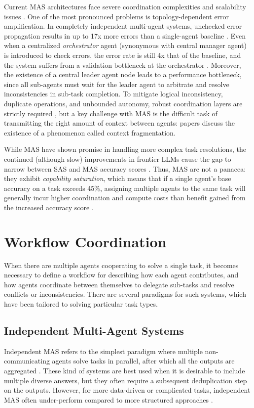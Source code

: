 \documentclass[conference]{IEEEtran}
\begin{document}
Current MAS architectures face severe coordination complexities and scalability issues 
\cite{yarmohammadtoosky_llm-powered_2026}. 
One of the most pronounced problems is topology-dependent error amplification. 
In completely independent multi-agent systems, unchecked error propagation results in up to 17x 
more errors than a single-agent baseline \cite{kim_towards_2026}. 
Even when a centralized \emph{orchestrator} agent (synonymous with central manager agent) 
is introduced to check errors, the error rate is still 4x that of the baseline, 
and the system suffers from a validation bottleneck at the orchestrator \cite{kim_towards_2026}.
Moreover, the existence of a central leader agent node leads to a performance bottleneck, since
all sub-agents must wait for the leader agent to arbitrate and resolve inconsistencies in sub-task
completion.
To mitigate logical inconsistency, duplicate operations, and unbounded autonomy, 
robust coordination layers are strictly required \cite{adimulam_orchestration_2026},
but a key challenge with MAS is the difficult task of transmitting the right amount of context 
between agents: papers discuss the existence of a phenomenon called context fragmentation.

While MAS have shown promise in handling more complex task resolutions, the continued (although
slow) improvements in frontier LLMs cause the gap to narrow between SAS and MAS accuracy scores
\cite{gao_single-agent_2025}.
Thus, MAS are not a panacea: they exhibit \emph{capability saturation},
which means that if a single agent's base accuracy on a task exceeds 45\%, 
assigning multiple agents to the same task will generally incur higher coordination 
and compute costs than benefit gained from the increased accuracy score \cite{kim_towards_2026}.


\section{Workflow Coordination}
When there are multiple agents cooperating to solve a single task, it becomes necessary to define a
workflow for describing how each agent contributes, and how agents coordinate between themselves to
delegate sub-tasks and resolve conflicts or inconsistencies.
There are several paradigms for such systems, which have been tailored to solving particular task types.

\subsection{Independent Multi-Agent Systems}
Independent MAS refers to the simplest paradigm where multiple non-communicating agents solve tasks in
parallel, after which all the outputs are aggregated \cite{kim_towards_2026}.
These kind of systems are best used when it is desirable to include multiple diverse answers, but
they often require a subsequent deduplication step on the outputs.
However, for more data-driven or complicated tasks, independent MAS often under-perform compared to
more structured approaches \cite{taleb_expansion-contraction_2026}.
\end{document}

